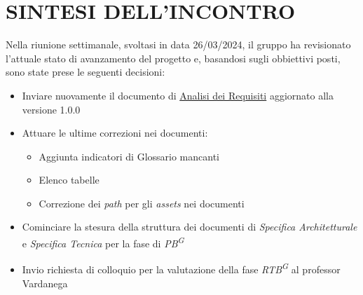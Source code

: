 \documentclass[5pt]{article}
\begin{document}
\section{SINTESI DELL'INCONTRO}
Nella riunione settimanale, svoltasi in data 26/03/2024, il gruppo ha revisionato l'attuale stato di avanzamento del progetto e, 
basandosi sugli obbiettivi posti, sono state prese le seguenti decisioni:
\begin{itemize}
	\item Inviare nuovamente il documento di \href{https://jackpot-coding.github.io/chatSQL/docs/esterni/analisi-dei-requisiti_V1.1.0.pdf}{Analisi dei Requisiti} aggiornato alla versione 1.0.0
	\item Attuare le ultime correzioni nei documenti:
        \begin{itemize}
            \item Aggiunta indicatori di Glossario mancanti
            \item Elenco tabelle 
            \item Correzione dei \textit{path} per gli \textit{assets} nei documenti 
        \end{itemize}
    \item Cominciare la stesura della struttura dei documenti di \textit{Specifica Architetturale} e \textit{Specifica Tecnica} per la fase di \textit{PB\textsuperscript{G}} 
    \item Invio richiesta di colloquio per la valutazione della fase \textit{RTB\textsuperscript{G}} al professor Vardanega
\end{itemize}
\end{document}
